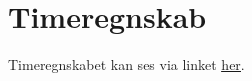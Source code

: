 \section*{Timeregnskab}
Timeregnskabet kan ses via linket 
    \color{blue}
    \underline{\href{https://goo.gl/Rsx9wG}{her}}.
    \color{black}

\pagebreak
\tableofcontents
